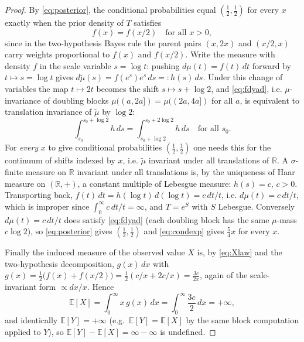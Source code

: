 \documentclass{amsart}
\theoremstyle{plain}
\theoremstyle{definition}
\begin{document}
\begin{proof}
By \eqref{eq:posterior}, the conditional probabilities equal
$(\tfrac12,\tfrac12)$ for every $x$ exactly when the prior density of $T$
satisfies
\begin{equation}\label{eq:fdyad}
f(x)=f(x/2)\quad\text{for all }x>0 ,
\end{equation}
since in the two-hypothesis Bayes rule the parent pairs $(x,2x)$ and $(x/2,x)$
carry weights proportional to $f(x)$ and $f(x/2)$. Write the measure with density
$f$ in the scale variable $s=\log t$: pushing $d\mu(t)=f(t)\,dt$ forward by
$t\mapsto s=\log t$ gives $d\tilde\mu(s)=f(e^s)e^s\,ds=:h(s)\,ds$. Under this
change of variables the map $t\mapsto 2t$ becomes the shift $s\mapsto s+\log 2$,
and \eqref{eq:fdyad}, i.e. $\mu$-invariance of doubling blocks
$\mu((a,2a])=\mu((2a,4a])$ for all $a$, is equivalent to translation invariance
of $\tilde\mu$ by $\log 2$:
\[
\int_{s_0}^{s_0+\log 2} h\,ds=\int_{s_0+\log 2}^{s_0+2\log 2} h\,ds
\quad\text{for all }s_0 .
\]
For \emph{every} $x$ to give conditional probabilities $(\tfrac12,\tfrac12)$ one
needs this for the continuum of shifts indexed by $x$, i.e. $\tilde\mu$ invariant
under all translations of $\mathbb R$. A $\sigma$-finite measure on $\mathbb R$
invariant under all translations is, by the uniqueness of Haar measure on
$(\mathbb R,+)$, a constant multiple of Lebesgue measure: $h(s)=c$, $c>0$.
Transporting back, $f(t)\,dt=h(\log t)\,d(\log t)=c\,dt/t$, i.e.
$d\mu(t)=c\,dt/t$, which is improper since $\int_0^\infty c\,dt/t=\infty$, and
$T=e^S$ with $S$ Lebesgue. Conversely $d\mu(t)=c\,dt/t$ does satisfy
\eqref{eq:fdyad} (each doubling block has the same $\mu$-mass $c\log 2$), so
\eqref{eq:posterior} gives $(\tfrac12,\tfrac12)$ and \eqref{eq:condexp} gives
$\tfrac54x$ for every $x$.

Finally the induced measure of the observed value $X$ is, by \eqref{eq:Xlaw} and
the two-hypothesis decomposition, $g(x)\,dx$ with
$g(x)=\tfrac12\bigl(f(x)+f(x/2)\bigr)=\tfrac12(c/x+2c/x)=\tfrac{3c}{2x}$, again of
the scale-invariant form $\propto dx/x$. Hence
\[
\mathbb E[X]=\int_0^\infty x\,g(x)\,dx=\int_0^\infty \frac{3c}{2}\,dx=+\infty,
\]
and identically $\mathbb E[Y]=+\infty$ (e.g.\ $\mathbb E[Y]=\mathbb E[X]$ by the
same block computation applied to $Y$), so
$\mathbb E[Y]-\mathbb E[X]=\infty-\infty$ is undefined.
\end{proof}
\end{document}
